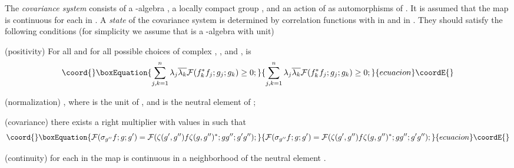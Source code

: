\documentclass[12pt,a4paper]{article}
\begin{document}
The {\sl covariance system} \coordHE{} consists of a \coordHE{}-algebra
\coordHE{}, a locally compact group \coordHE{}, and an action \myHighlight{$\sigma$}\coordHE{} of \coordHE{}
as automorphisms of \coordHE{}. It is assumed that the map
\coordHE{} is continuous for each \coordHE{} in \coordHE{}.
A {\sl state} of the covariance system is determined by correlation
functions \coordHE{} with \coordHE{} in \coordHE{} and \coordHE{} in \coordHE{}.
They should satisfy the following conditions (for simplicity
we assume that \coordHE{} is a \coordHE{}-algebra with unit)
\begin{description}
\item {}(positivity) For all \coordHE{} and for all possible choices of complex \coordHE{},
\coordHE{}, and \coordHE{}, is
\begin{equation}\coord{}\boxEquation{
\sum_{j,k=1}^n\lambda_j\overline{\lambda_k}{\cal F}(f_k^*f_j;g_j;g_k)\ge 0;
}{
\sum_{j,k=1}^n\lambda_j\overline{\lambda_k}{\cal F}(f_k^*f_j;g_j;g_k)\ge 0;
}{ecuacion}\coordE{}\end{equation}
\item {}(normalization) \coordHE{}, where \coordHE{} is the unit of \coordHE{},
and \coordHE{} is the neutral element of \coordHE{};
\item {}(covariance) there exists a right multiplier \myHighlight{$\zeta$}\coordHE{} with values in \coordHE{}
such that
\begin{equation}\coord{}\boxEquation{
{\cal F}(\sigma_{g''}f;g;g')={\cal F}(\zeta(g',g'')f\zeta(g,g'')^*;gg'';g'g'');
\label{covdef}
}{
{\cal F}(\sigma_{g''}f;g;g')={\cal F}(\zeta(g',g'')f\zeta(g,g'')^*;gg'';g'g'');
}{ecuacion}\coordE{}\end{equation}
\item {}(continuity) for each \coordHE{} in \coordHE{} the map \coordHE{} is
continuous in a neighborhood of the neutral element \coordHE{}.
\end{description}
\end{document}
